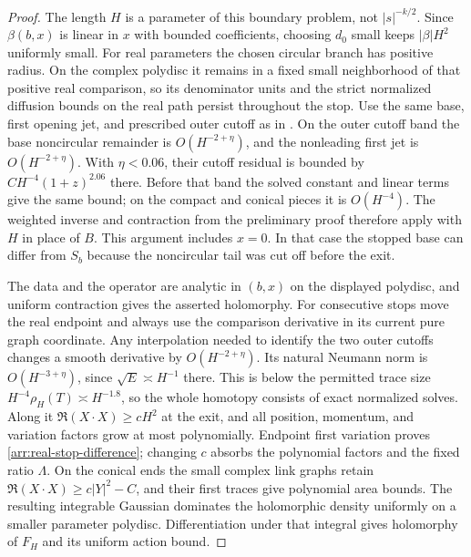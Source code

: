 \begin{proof}
The length $H$ is a parameter of this boundary problem, not
$|s|^{-k/2}$.  Since $\beta(b,x)$ is linear in $x$ with bounded
coefficients, choosing $d_0$ small keeps $|\beta|H^2$ uniformly small.
For real parameters the chosen circular branch has positive radius.
On the complex polydisc it remains in a fixed small neighborhood of
that positive real comparison, so its denominator units and the strict
normalized diffusion bounds on the real path persist throughout the stop.  Use the
same base, first opening jet, and prescribed outer cutoff as in
.  On the outer cutoff band the base
noncircular remainder is $O(H^{-2+\eta})$, and the nonleading first
jet is $O(H^{-2+\eta})$.  With $\eta<0.06$, their cutoff residual is
bounded by $CH^{-4}(1+z)^{2.06}$ there.  Before that band the solved
constant and linear terms give the same bound; on the compact and
conical pieces it is $O(H^{-4})$.  The weighted inverse and contraction
from the preliminary proof therefore apply with $H$ in place of $B$.
This argument includes $x=0$.  In that case the stopped base can differ
from $S_b$ because the noncircular tail was cut off before the exit.

The data and the operator are analytic in $(b,x)$ on the displayed
polydisc, and uniform contraction gives the asserted holomorphy.
For consecutive stops move the real endpoint and always use the
comparison derivative in its current pure graph coordinate.  Any
interpolation needed to identify the two outer cutoffs changes a
smooth derivative by $O(H^{-2+\eta})$.  Its natural Neumann norm is
$O(H^{-3+\eta})$, since $\sqrt E\asymp H^{-1}$ there.  This is below
the permitted trace size $H^{-4}\rho_H(T)\asymp H^{-1.8}$, so the
whole homotopy consists of exact normalized solves.  Along it
$\Re(X\cdot X)\ge cH^2$ at the exit, and all position, momentum,
and variation factors grow at most polynomially.  Endpoint first
variation proves \eqref{arr:real-stop-difference}; changing $c$ absorbs
the polynomial factors and the fixed ratio $\Lambda$.  On the conical
ends the small complex link graphs retain
$\Re(X\cdot X)\ge c|Y|^2-C$, and their first traces give polynomial
area bounds.  The resulting integrable Gaussian dominates the holomorphic
density uniformly on a smaller parameter polydisc.  Differentiation
under that integral gives holomorphy of $F_H$ and its uniform action bound.


\end{proof}
